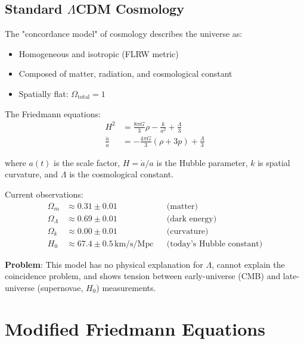 \subsection{Standard $\Lambda$CDM Cosmology}

\begin{level2}
The "concordance model" of cosmology\cite{peebles2003,planck2018} describes the universe as:
\begin{itemize}
\item Homogeneous and isotropic (FLRW metric)
\item Composed of matter, radiation, and cosmological constant
\item Spatially flat: $\Omega_{\text{total}} = 1$
\end{itemize}

The Friedmann equations\cite{friedmann1922,lemaitre1927,robertson1935}:
\begin{align}
H^2 &= \frac{8\pi G}{3} \rho - \frac{k}{a^2} + \frac{\Lambda}{3} \label{eq:friedmann1-standard} \\
\frac{\ddot{a}}{a} &= -\frac{4\pi G}{3} (\rho + 3p) + \frac{\Lambda}{3} \label{eq:friedmann2-standard}
\end{align}

where $a(t)$ is the scale factor, $H = \dot{a}/a$ is the Hubble parameter, $k$ is spatial curvature, and $\Lambda$ is the cosmological constant.

Current observations\cite{planck2018}:
\begin{align}
\Omega_m &\approx 0.31 \pm 0.01 && \text{(matter)} \\
\Omega_\Lambda &\approx 0.69 \pm 0.01 && \text{(dark energy)} \\
\Omega_k &\approx 0.00 \pm 0.01 && \text{(curvature)} \\
H_0 &\approx 67.4 \pm 0.5 \, \text{km/s/Mpc} && \text{(today's Hubble constant)}
\end{align}

\textbf{Problem}: This model has no physical explanation for $\Lambda$, cannot explain the coincidence problem, and shows tension between early-universe (CMB) and late-universe (supernovae, $H_0$) measurements\cite{divalentino2021}.
\end{level2}

\section{Modified Friedmann Equations}

